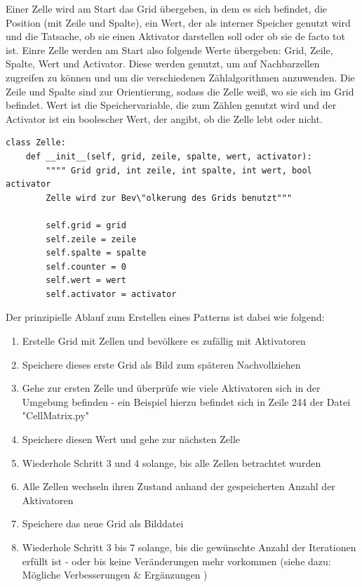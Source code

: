 \documentclass[]{article}
\begin{document}
\vspace{10pt}

Einer Zelle wird am Start das Grid \"ubergeben, in dem es sich befindet, die Position (mit Zeile und Spalte), ein Wert, der als interner Speicher genutzt wird und die Tatsache, ob sie einen Aktivator darstellen soll oder ob sie de facto tot ist.
Einre Zelle werden am Start also folgende Werte \"ubergeben: Grid, Zeile, Spalte, Wert und Activator. Diese werden genutzt, um auf Nachbarzellen zugreifen zu k\"onnen und um die verschiedenen Z\"ahlalgorithmen anzuwenden. Die Zeile und Spalte sind zur Orientierung, sodass die Zelle wei\ss , wo sie sich im Grid befindet. Wert ist die Speichervariable, die zum Z\"ahlen genutzt wird und der Activator ist ein boolescher Wert, der angibt, ob die Zelle lebt oder nicht. 

\newpage

\begin{lstlisting}
class Zelle:	
	def __init__(self, grid, zeile, spalte, wert, activator):
		"""" Grid grid, int zeile, int spalte, int wert, bool activator 
		Zelle wird zur Bev\"olkerung des Grids benutzt"""

		self.grid = grid
		self.zeile = zeile
		self.spalte = spalte
		self.counter = 0
		self.wert = wert
		self.activator = activator
\end{lstlisting}

\vspace{10pt}

Der prinzipielle Ablauf zum Erstellen eines Patterns ist dabei wie folgend:
\begin{enumerate}
	\item Erstelle Grid mit Zellen und bev\"olkere es zuf\"allig mit Aktivatoren
	\item Speichere dieses erste Grid als Bild zum sp\"ateren Nachvollziehen
	\item Gehe zur ersten Zelle und \"uberpr\"ufe wie viele Aktivatoren sich in der Umgebung befinden - ein Beispiel hierzu befindet sich in Zeile 244 der Datei "CellMatrix.py"
	\item Speichere diesen Wert und gehe zur n\"achsten Zelle
	\item Wiederhole Schritt 3 und 4 solange, bis alle Zellen betrachtet wurden
	\item Alle Zellen wechseln ihren Zustand anhand der gespeicherten Anzahl der Aktivatoren
	\item Speichere das neue Grid als Bilddatei
	\item Wiederhole Schritt 3 bis 7 solange, bis die gew\"unschte Anzahl der Iterationen erf\"ullt ist - oder bis keine Ver\"anderungen mehr vorkommen (siehe dazu: M\"ogliche Verbesserungen \& Erg\"anzungen )
\end{enumerate}
\end{document}
